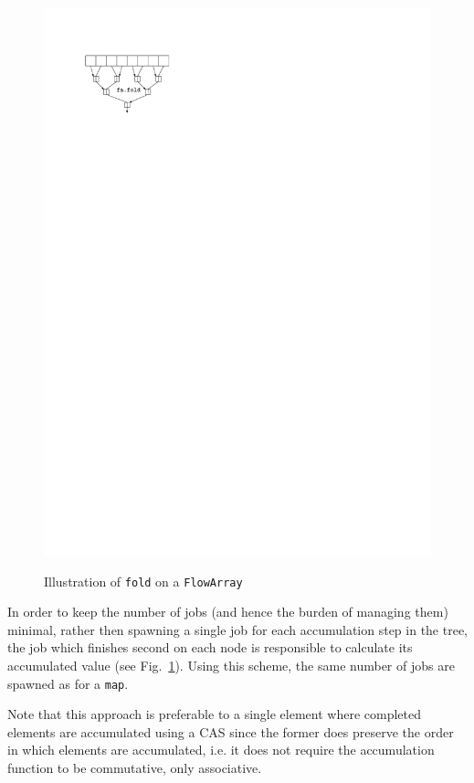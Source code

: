 \documentclass[runningheads,a4paper,fleqn]{llncs}
\begin{document}
\begin{figure}
{    \includegraphics{fa-fold-calc}%
    \label{fig:fa-fold-calc}}
  \caption{Illustration of \texttt{fold} on a \texttt{FlowArray}}
\end{figure}

In order to keep the number of jobs (and hence the burden of managing
them) minimal, rather then spawning a single job for each accumulation
step in the tree, the job which finishes second on each node is
responsible to calculate its accumulated value (see
Fig.~\ref{fig:fa-fold-calc}). Using this scheme, the 
same number of jobs are spawned as for a \texttt{map}.

Note that this approach is preferable to a single element where
completed elements are accumulated using a CAS since the former
does preserve the order in which elements are accumulated, i.e. it
does not require the accumulation function to be commutative, only
associative.
\end{document}
